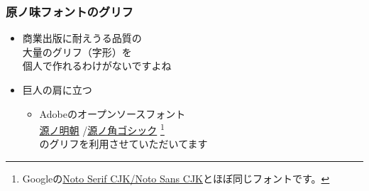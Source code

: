 \bgroup
\let\oldfootnoterule\footnoterule
\def\footnoterule{\only<2->\oldfootnoterule}
\begin{frame}\frametitle{原ノ味フォントのグリフ}
  \begin{itemize}
  \item 商業出版に耐えうる品質の \\
    大量のグリフ（字形）を \\
    個人で作れるわけがないですよね

    \pause
    \vspace{1\zh}

  \item 巨人の肩に立つ
    \begin{itemize}
    \item Adobeのオープンソースフォント \\
      \href{https://github.com/adobe-fonts/source-han-serif}{源ノ明朝}%
      /\href{https://github.com/adobe-fonts/source-han-sans}{源ノ角ゴシック}%
      \footnote<2->{\tiny
        Googleの\href{https://www.google.com/get/noto/help/cjk/}%
        {Noto Serif CJK/Noto Sans CJK}とほぼ同じフォントです。} \\
      のグリフを利用させていただいてます
    \end{itemize}
  \end{itemize}
\end{frame}
\egroup

